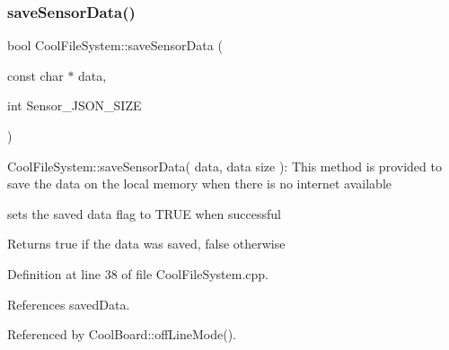 \subsubsection{\texorpdfstring{save\+Sensor\+Data()}{saveSensorData()}}
{\footnotesize\ttfamily bool Cool\+File\+System\+::save\+Sensor\+Data (\begin{DoxyParamCaption}\item[{const char $\ast$}]{data,  }\item[{int}]{Sensor\+\_\+\+J\+S\+O\+N\+\_\+\+S\+I\+ZE }\end{DoxyParamCaption})}

Cool\+File\+System\+::save\+Sensor\+Data( data, data size )\+: This method is provided to save the data on the local memory when there is no internet available

sets the saved data flag to T\+R\+UE when successful

\begin{DoxyReturn}{Returns}
true if the data was saved, false otherwise 
\end{DoxyReturn}


Definition at line 38 of file Cool\+File\+System.\+cpp.



References saved\+Data.



Referenced by Cool\+Board\+::off\+Line\+Mode().


